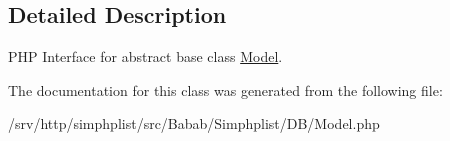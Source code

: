 \subsection{Detailed Description}
P\+H\+P Interface for abstract base class \hyperlink{classBabab_1_1Simphplist_1_1DB_1_1Model}{Model}. 

The documentation for this class was generated from the following file\+:\begin{DoxyCompactItemize}
\item 
/srv/http/simphplist/src/\+Babab/\+Simphplist/\+D\+B/Model.\+php\end{DoxyCompactItemize}
